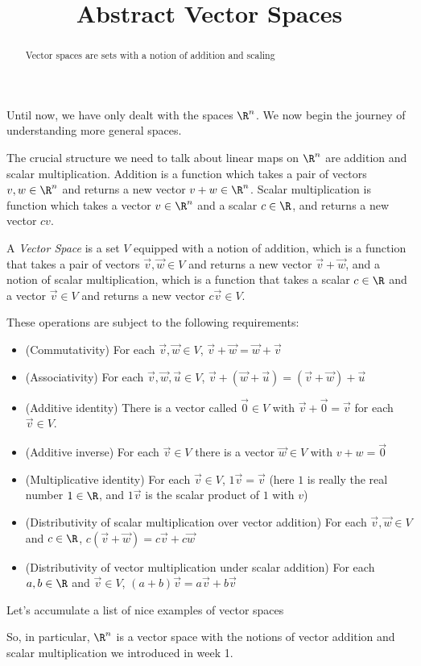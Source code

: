 \documentclass{ximera}
\title{Abstract Vector Spaces}
\begin{document}
	\begin{abstract}
		Vector spaces are sets with a notion of addition and scaling
	\end{abstract}
	Until now, we have only dealt with the spaces $\R^n$.  We now begin the journey of understanding  more 
	general spaces.  
	
	The crucial structure we need to talk about linear maps on $\R^n$ are addition and scalar multiplication.  Addition is a function which takes a 
	pair of vectors $v,w \in \R^n$ and returns a new vector $v+w \in \R^n$.  Scalar multiplication is function which takes a vector $v \in \R^n$  and 
	a scalar $c \in \R$, and returns a new vector $cv$.  
	
	\begin{definition}
		A \textit{Vector Space} is a set $V$ equipped with a notion of addition, which is a function that takes a pair of vectors $\vec{v},\vec{w} \in V$ and returns 
		a new vector $\vec{v}+\vec{w}$, and a notion of scalar multiplication, which is a function that takes a scalar $c \in \R$ and a vector $\vec{v} \in V$ and returns a 
		new vector $c\vec{v} \in V$.
		
		These operations are subject to the following requirements:
		
		\begin{itemize}
			\item (Commutativity) For each $\vec{v},\vec{w} \in V$, $ \vec{v} +\vec{w} = \vec{w}+\vec{v}$
			\item (Associativity) For each $\vec{v},\vec{w},\vec{u} \in V$, $\vec{v} +(\vec{w} +\vec{u}) = (\vec{v} +\vec{w}) +\vec{u}$
			\item (Additive identity) There is a vector called $\vec{0} \in V$ with $\vec{v}+\vec{0} = \vec{v}$ for each $\vec{v} \in V$.
			\item (Additive inverse) For each $\vec{v} \in V$ there is a vector $\vec{w} \in V$ with $v+w = \vec{0}$
			\item (Multiplicative identity) For each $\vec{v} \in V$, $1\vec{v}= \vec{v}$ (here $1$ is really the real number $1 \in \R$, and $1\vec{v}$ is the
			scalar product of $1$ with $v$)
			\item (Distributivity of scalar multiplication over vector addition)  For each $\vec{v},\vec{w} \in V$ and $c \in \R$, $c(\vec{v}+\vec{w}) = c\vec{v} + c\vec{w}$
			\item (Distributivity of vector  multiplication under scalar addition) For each $a,b \in \R$ and $\vec{v} \in V$, $(a+b)\vec{v} = a\vec{v}+b\vec{v}$
		\end{itemize}
		
	\end{definition}
		Let's accumulate a list of nice examples of vector spaces
		\begin{example}
		So, in particular, $\R^n$ is a vector space with the notions of vector addition and scalar multiplication we introduced in week 1.  
		\end{example}
\end{document}
